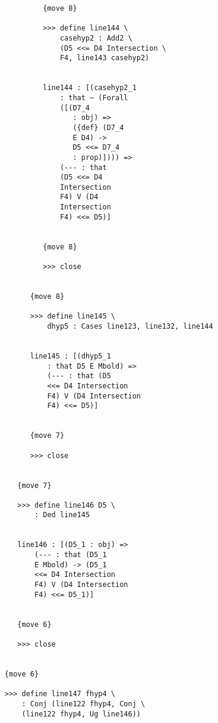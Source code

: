 \documentclass[12pt]{article}
\begin{document}
\begin{verbatim}
                           {move 8}

                           >>> define line144 \
                               casehyp2 : Add2 \
                               (D5 <<= D4 Intersection \
                               F4, line143 casehyp2)


                           line144 : [(casehyp2_1 
                               : that ~ (Forall 
                               ([(D7_4 
                                  : obj) => 
                                  ({def} (D7_4 
                                  E D4) -> 
                                  D5 <<= D7_4 
                                  : prop)]))) => 
                               (--- : that 
                               (D5 <<= D4 
                               Intersection 
                               F4) V (D4 
                               Intersection 
                               F4) <<= D5)]


                           {move 8}

                           >>> close


                        {move 8}

                        >>> define line145 \
                            dhyp5 : Cases line123, line132, line144


                        line145 : [(dhyp5_1 
                            : that D5 E Mbold) => 
                            (--- : that (D5 
                            <<= D4 Intersection 
                            F4) V (D4 Intersection 
                            F4) <<= D5)]


                        {move 7}

                        >>> close


                     {move 7}

                     >>> define line146 D5 \
                         : Ded line145


                     line146 : [(D5_1 : obj) => 
                         (--- : that (D5_1 
                         E Mbold) -> (D5_1 
                         <<= D4 Intersection 
                         F4) V (D4 Intersection 
                         F4) <<= D5_1)]


                     {move 6}

                     >>> close


                  {move 6}

                  >>> define line147 fhyp4 \
                      : Conj (line122 fhyp4, Conj \
                      (line122 fhyp4, Ug line146))



\end{verbatim}
\end{document}

